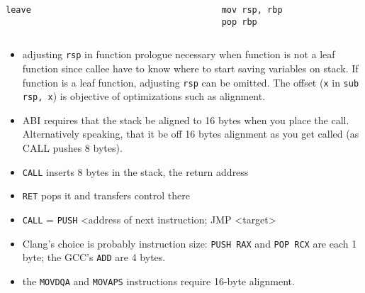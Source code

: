 \begin{frame}
    \centering
    \begin{columns}
        \begin{column}{.3\textwidth}
            \begin{lstlisting}[language={}]
leave
            \end{lstlisting}
        \end{column}
        \begin{column}{.2\textwidth}
            \centering
            \scalebox{2.}{$\Leftrightarrow$}
        \end{column}
        \begin{column}{.3\textwidth}
            \begin{lstlisting}[language={}]
mov rsp, rbp
pop rbp
            \end{lstlisting}
        \end{column}
    \end{columns}
\end{frame}

\begin{frame}[plain]
    \begin{itemize}
        \item adjusting \texttt{rsp} in function prologue necessary when function is not a leaf function since callee have to know where to start saving variables on stack. If function is a leaf function, adjusting \texttt{rsp} can be omitted. The offset (\texttt{x} in \texttt{sub rsp, x}) is objective of optimizations such as alignment.
        \item ABI requires that the stack be aligned to 16 bytes when you place the call. Alternatively speaking, that it be off 16 bytes alignment as you get called (as CALL pushes 8 bytes).
        \item \texttt{CALL} inserts 8 bytes in the stack, the return address
        \item \texttt{RET} pops it and transfers control there
        \item \texttt{CALL} = \texttt{PUSH} <address of next instruction; JMP <target>
        \item Clang's choice is probably instruction size: \texttt{PUSH RAX} and \texttt{POP RCX} are each 1 byte; the GCC's \texttt{ADD} are 4 bytes.
        \item the \texttt{MOVDQA} and \texttt{MOVAPS} instructions require 16-byte alignment.
    \end{itemize}
\end{frame}

